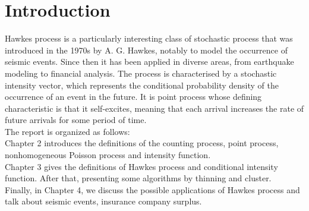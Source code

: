 \chapter{Introduction}
Hawkes process is a particularly interesting class of stochastic process that
was introduced in the 1970s by A. G. Hawkes, notably to model the occurrence of seismic events. Since then it has been applied in diverse areas, from earthquake modeling to financial analysis. The process is characterised by a stochastic intensity vector, which represents the conditional probability density of the occurrence of an event in the future. It is point process whose defining characteristic is that it self-excites, meaning that each arrival increases the rate of future arrivals for some period of time.
\\
The report is organized as follows:
\\
Chapter 2 introduces the definitions of the counting process, point process, nonhomogeneous Poisson process and intensity function.
\\
Chapter 3 gives the definitions of Hawkes process and conditional intensity function. After that, presenting some algorithms by thinning and cluster. 
\\
Finally, in Chapter 4, we discuss the possible applications of Hawkes process and talk
about seismic events, insurance company surplus.